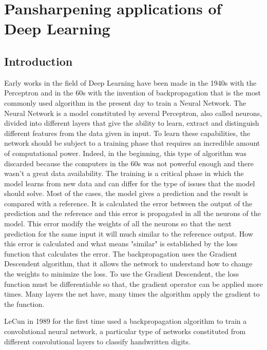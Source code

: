 \documentclass[12pt]{report}
\begin{document}
\newpage

\chapter{Pansharpening applications of Deep Learning}

\section{Introduction}

Early works in the field of Deep Learning have been made in the 1940s with the Perceptron \cite{perceptron} and in the 60s with the invention
of backpropagation that is the most commonly used algorithm in the present day to train a Neural Network.
The Neural Network is a model constituted by several Perceptron, also called neurons, divided into different layers that give the 
ability to learn, extract and distinguish different features from the data given in input.
To learn these capabilities, the network should be subject to a training phase that requires an incredible amount of
computational power.
Indeed, in the beginning, this type of algorithm was discarded because the computers in the 60s was
not powerful enough and there wasn't a great data availability. 
The training is a critical phase in which the model learns from new data and can differ for the type of issues that the model should solve.
Most of the cases, the model gives a prediction and the result is compared with a reference. It is calculated the error between the
output of the prediction and the reference and this error is propagated in all the neurons of the model. 
This error modify the weights of all the neurons so that the next prediction for the same input it will much similar to the
reference output. 
How this error is calculated and what means "similar" is established by the loss function that calculates the error.
The backpropagation uses the Gradient Descendent algorithm, that it allows the network 
to understand how to change the weights to minimize the loss.
To use the Gradient Descendent, the loss function must be differentiable so that,
the gradient operator can be applied more times.
Many layers the net have, many times the algorithm apply the gradient to the function.

LeCun in 1989 for the first time used a backpropagation algorithm to train a convolutional neural network, a particular
type of networks constituted from different convolutional layers to classify handwritten digits.
\end{document}
